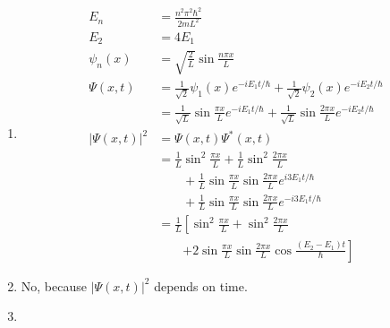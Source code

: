 \documentclass{article}
\begin{document}
\begin{enumerate}
  \item

        \begin{align*}
          E_n            & = \frac{n^2 \pi^2 \hbar^2}{2 m L^2}                                                                                             \\
          E_2            & = 4 E_1                                                                                                                         \\
          \psi_n(x)      & = \sqrt{\frac{2}{L}} \sin \frac{n \pi x}{L}                                                                                     \\
          \Psi(x, t)     & = \frac{1}{\sqrt{2}} \psi_1(x) e^{-i E_1 t / \hbar} + \frac{1}{\sqrt{2}} \psi_2(x) e^{-i E_2 t / \hbar}                         \\
                         & = \frac{1}{\sqrt{L}} \sin \frac{\pi x}{L} e^{-i E_1 t / \hbar} + \frac{1}{\sqrt{L}} \sin \frac{2 \pi x}{L} e^{-i E_2 t / \hbar} \\
          |\Psi(x, t)|^2 & = \Psi(x, t) \Psi^*(x, t)                                                                                                       \\
                         & = \frac{1}{L} \sin^2 \frac{\pi x}{L} + \frac{1}{L} \sin^2 \frac{2 \pi x}{L}                                                     \\
                         & \qquad + \frac{1}{L} \sin \frac{\pi x}{L} \sin \frac{2 \pi x}{L} e^{i 3 E_1 t / \hbar}                                          \\
                         & \qquad + \frac{1}{L} \sin \frac{\pi x}{L} \sin \frac{2 \pi x}{L} e^{-i 3 E_1 t / \hbar}                                         \\
                         & = \frac{1}{L} \left[ \sin^2 \frac{\pi x}{L} + \sin^2 \frac{2 \pi x}{L} \right.                                                  \\
                         & \qquad \left. + 2 \sin \frac{\pi x}{L} \sin \frac{2 \pi x}{L} \cos \frac{(E_2 - E_1) t}{\hbar} \right]
        \end{align*}

  \item No, because $|\Psi(x, t)|^2$ depends on time.

  \item


\end{enumerate}
\end{document}
